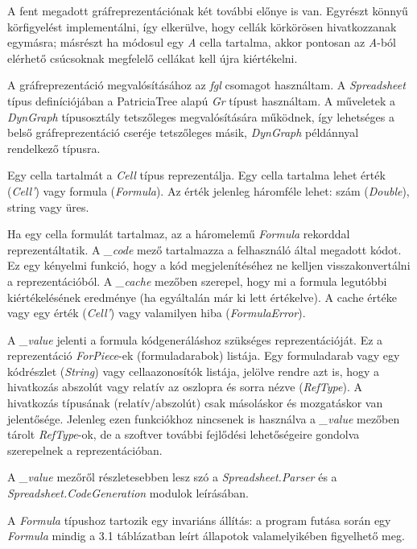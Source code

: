 A fent megadott gráfreprezentációnak két további előnye is van. Egyrészt könnyű körfigyelést implementálni, így elkerülve, hogy cellák körkörösen hivatkozzanak egymásra; másrészt ha módosul egy \textit{A} cella tartalma, akkor pontosan az \textit{A}-ból elérhető csúcsoknak megfelelő cellákat kell újra kiértékelni.

A gráfreprezentáció megvalósításához az \textit{fgl} csomagot használtam. A \textit{Spreadsheet} típus definíciójában a PatriciaTree alapú \textit{Gr} típust használtam. A műveletek a \textit{DynGraph} típusosztály tetszőleges megvalósítására működnek, így lehetséges a belső gráfreprezentáció cseréje tetszőleges másik, \textit{DynGraph} példánnyal rendelkező típusra.

Egy cella tartalmát a \textit{Cell} típus reprezentálja. Egy cella tartalma lehet érték (\textit{Cell'}) vagy formula (\textit{Formula}). Az érték jelenleg háromféle lehet: szám (\textit{Double}), string vagy üres.

Ha egy cella formulát tartalmaz, az a háromelemű \textit{Formula} rekorddal reprezentáltatik. A \textit{\_code} mező tartalmazza a felhasználó által megadott kódot. Ez egy kényelmi funkció, hogy a kód megjelenítéséhez ne kelljen visszakonvertálni a reprezentációból. A \textit{\_cache} mezőben szerepel, hogy mi a formula legutóbbi kiértékelésének eredménye (ha egyáltalán már ki lett értékelve). A cache értéke vagy egy érték (\textit{Cell'}) vagy valamilyen hiba (\textit{FormulaError}). 

A \textit{\_value} jelenti a formula kódgeneráláshoz szükséges reprezentációját.  Ez a reprezentáció \textit{ForPiece}-ek (formuladarabok) listája. Egy formuladarab vagy egy kódrészlet (\textit{String}) vagy cellaazonosítók listája, jelölve rendre azt is, hogy a hivatkozás abszolút vagy relatív az oszlopra és sorra nézve (\textit{RefType}). A hivatkozás típusának (relatív/abszolút) csak másoláskor és mozgatáskor van jelentősége. Jelenleg ezen funkciókhoz nincsenek is használva a \textit{\_value} mezőben tárolt \textit{RefType}-ok, de a szoftver további fejlődési lehetőségeire gondolva szerepelnek a reprezentációban.

A \textit{\_value} mezőről részletesebben lesz szó a \textit{Spreadsheet.Parser} és a \textit{Spreadsheet.CodeGeneration} modulok leírásában. 

A \textit{Formula} típushoz tartozik egy invariáns állítás: a program futása során egy \textit{Formula} mindig a 3.1 táblázatban leírt állapotok valamelyikében figyelhető meg.

